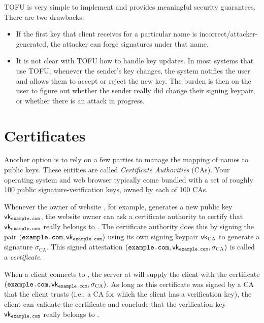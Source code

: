 TOFU is very simple to implement and provides meaningful security
guarantees. 
There are two drawbacks:
\begin{itemize}
  \item If the first key that client receives for a particular name 
        is incorrect/attacker-generated, the attacker can forge signatures
        under that name.
  \item It is not clear with TOFU how to handle key updates. In most systems that use TOFU, whenever the sender's key changes, the system notifies the user and allows them to accept or reject the new key. The burden is then on the user to figure out whether the sender really did change their signing keypair, or whether there is an attack in progress.
\end{itemize}

\section{Certificates}
Another option is to rely on a few parties to
manage the mapping of names to public keys.
These entities are called \emph{Certificate Authorities} (CAs).
Your operating system and web browser typically come bundled with a
set of roughly 100 public signature-verification keys, owned by 
each of 100 CAs.

Whenever the owner of website , for example, generates 
a new public key $\vk_\ttt{example.com}$, the website owner can ask a 
certificate authority to certify that $\vk_\ttt{example.com}$ really belongs to .
The certificate authority does this by signing the
pair $(\ttt{example.com}, \vk_\ttt{example.com})$
using its own signing keypair $\mathsf{vk}_\text{CA}$
to generate a signature $\sigma_\text{CA}$.
This signed attestation $(\ttt{example.com},\allowbreak \vk_\ttt{example.com},\allowbreak \sigma_\text{CA})$
is called a \textit{certificate}.

When a client connects to , the server at 
will supply the client with the certificate $(\ttt{example.com},\allowbreak \vk_\ttt{example.com},\allowbreak\sigma_\text{CA})$.
As long as this certificate was signed by a CA that the client trusts (i.e., 
a CA for which the client has a verification key),
the client can validate the certificate and conclude that 
the verification key $\vk_\ttt{example.com}$ really belongs to .

